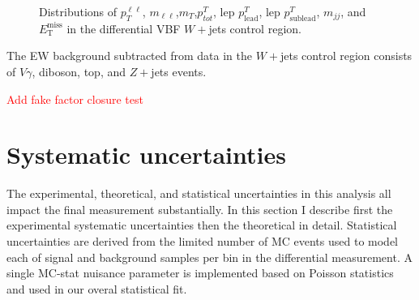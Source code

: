 \begin{figure}[!h]
{  }\hfill
  \hfill
  \hfill
{\caption{Distributions of $p_T^{\ell\ell}$, $m_{\ell\ell}$,$m_T$,$p^T_{tot}$, lep $p^T_{\text{lead}}$, lep $p^T_{\text{sublead}}$, $m_{jj}$, and $\ensuremath{E_{\text{T}}^{\text{miss}}}$ in the differential VBF $W+$jets control region.
\label{fig:WCR}}}
\end{figure}  

The EW background subtracted from data in the $W+$jets control region consists of $V\gamma$, diboson, top, and $Z+$jets events. 

\textcolor{red}{Add fake factor closure test}

\section{Systematic uncertainties}
The experimental, theoretical, and statistical uncertainties in this analysis all impact the final measurement substantially. In this section I describe first the experimental systematic uncertainties then the theoretical in detail. Statistical uncertainties are derived from the limited number of MC events used to model each of signal and background samples per bin in the differential measurement. A single MC-stat nuisance parameter is implemented based on Poisson statistics and used in our overal statistical fit. 

